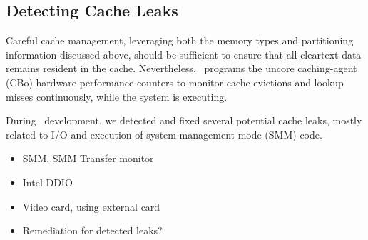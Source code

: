 \subsection{Detecting Cache Leaks}

Careful cache management, leveraging both the memory types and
partitioning information discussed above, should be sufficient to
ensure that all cleartext data remains resident in the cache.
Nevertheless, \vcage\ programs the uncore caching-agent (CBo) hardware
performance counters \cite{Intel-Uncore-E5-2600} to monitor cache
evictions and lookup misses continuously, while the system is
executing.

During \vcage\ development, we detected and fixed several potential
cache leaks, mostly related to I/O and execution of
system-management-mode (SMM) code.

\begin{itemize}
    \item SMM, SMM Transfer monitor
    \item Intel DDIO
    \item Video card, using external card
    \item Remediation for detected leaks?
\end{itemize}
